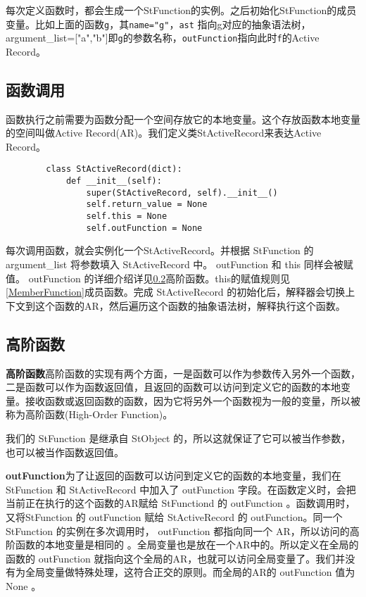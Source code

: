 \documentclass[a4paper]{article}
\begin{document}
\begin{CJK}{UTF8}{gbsn}
        每次定义函数时，都会生成一个StFunction的实例。之后初始化StFunction的成员变量。比如上面的函数{\tt g}，其{\tt name="g"}，{\tt ast} 指向g对应的抽象语法树， {argument\_list=["a","b"]}即{\tt g}的参数名称，{\tt outFunction}指向此时{\tt f}的Active Record。

    \subsection{函数调用}
        函数执行之前需要为函数分配一个空间存放它的本地变量。这个存放函数本地变量的空间叫做Active Record(AR)。我们定义类StActiveRecord来表达Active Record。
        \begin{verbatim}
        class StActiveRecord(dict):
            def __init__(self):
                super(StActiveRecord, self).__init__()
                self.return_value = None
                self.this = None
                self.outFunction = None
        \end{verbatim}
        每次调用函数，就会实例化一个StActiveRecord。并根据 StFunction 的 argument\_list 将参数填入 StActiveRecord 中。 outFunction 和 this 同样会被赋值。 outFunction 的详细介绍详见\ref{HighOrderFunction}高阶函数。this的赋值规则见\ref{MemberFunction}成员函数。完成 StActiveRecord 的初始化后，解释器会切换上下文到这个函数的AR，然后遍历这个函数的抽象语法树，解释执行这个函数。

    \subsection{高阶函数}\label{HighOrderFunction}
        {\bf 高阶函数}高阶函数的实现有两个方面，一是函数可以作为参数传入另外一个函数，二是函数可以作为函数返回值，且返回的函数可以访问到定义它的函数的本地变量。接收函数或返回函数的函数，因为它将另外一个函数视为一般的变量，所以被称为高阶函数(High-Order Function)。 

        我们的 StFunction 是继承自 StObject 的，所以这就保证了它可以被当作参数，也可以被当作函数返回值。

        {\bf outFunction}为了让返回的函数可以访问到定义它的函数的本地变量，我们在 StFunction 和 StActiveRecord 中加入了 outFunction 字段。在函数定义时，会把当前正在执行的这个函数的AR赋给 StFunctiond 的 outFunction 。函数调用时，又将StFunction 的 outFunction 赋给 StActiveRecord 的 outFunction。同一个 StFunction 的实例在多次调用时， outFunction 都指向同一个 AR，所以访问的高阶函数的本地变量是相同的 。全局变量也是放在一个AR中的。所以定义在全局的函数的 outFunction 就指向这个全局的AR，也就可以访问全局变量了。我们并没有为全局变量做特殊处理，这符合正交的原则。而全局的AR的 outFunction 值为 None 。


\end{CJK}
\end{document}
